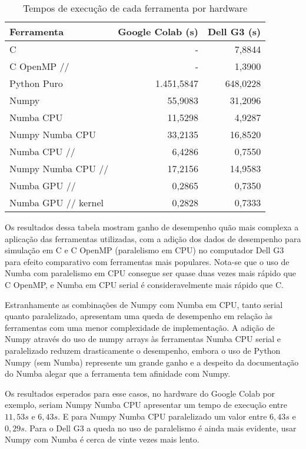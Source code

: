 \documentclass[
	12pt,				%
	a4paper,			%
	english,			%
	openright,				%
	brazil,				%
	oneside]{abntex2}
\begin{document}
\begin{table}[h]
	\begin{center}
		\begin{tabular}{lrr}
			\hline
			Ferramenta & Google Colab (s) & Dell G3 (s) \\
			\hline
			C& - &7,8844\\
			C OpenMP //& - &1,3900\\
			Python Puro& 1.451,5847 & 648,0228 \\
    		Numpy & 55,9083 & 31,2096 \\
			Numba CPU & 11,5298 & 4,9287\\
			Numpy Numba CPU & 33,2135 & 16,8520  \\
			Numba CPU // & 6,4286 & 0,7550  \\
			Numpy Numba CPU // & 17,2156 & 14,9583  \\
			Numba GPU //& 0,2865 & 0,7350   \\
			Numba GPU // kernel & 0,2828 & 0,7333\\
			\hline
		\end{tabular}
	\end{center}
	\vspace{-.1cm}
	\caption{Tempos de execução de cada ferramenta por hardware}
\end{table}

Os resultados dessa tabela mostram ganho de desempenho quão mais complexa a aplicação das ferramentas utilizadas, com a adição dos dados de desempenho para simulação em C e C OpenMP (paralelismo em CPU) no computador Dell G3 para efeito comparativo com ferramentas mais populares. Nota-se que o uso de Numba com paralelismo em CPU consegue ser quase duas vezes mais rápido que C OpenMP, e Numba em CPU serial é consideravelmente mais rápido que C.

Estranhamente as combinações de Numpy com Numba em CPU, tanto serial quanto paralelizado, apresentam uma queda de desempenho em relação às ferramentas com uma menor complexidade de implementação. A adição de Numpy através do uso de numpy arrays às ferramentas Numba CPU serial e paralelizado reduzem drasticamente o desempenho, embora o uso de Python Numpy (sem Numba) represente um grande ganho e a despeito da documentação do Numba alegar que a ferramenta tem afinidade com Numpy.

Os resultados esperados para esse casos, no hardware do Google Colab por exemplo, seriam Numpy Numba CPU apresentar um tempo de execução entre $11,53 s$ e $6,43 s$. E para Numpy Numba CPU paralelizado um valor entre  $6,43 s$ e $0,29 s$. Para o Dell G3 a queda no uso de paralelismo é ainda mais evidente, usar Numpy com Numba é cerca de vinte vezes mais lento.
\end{document}
